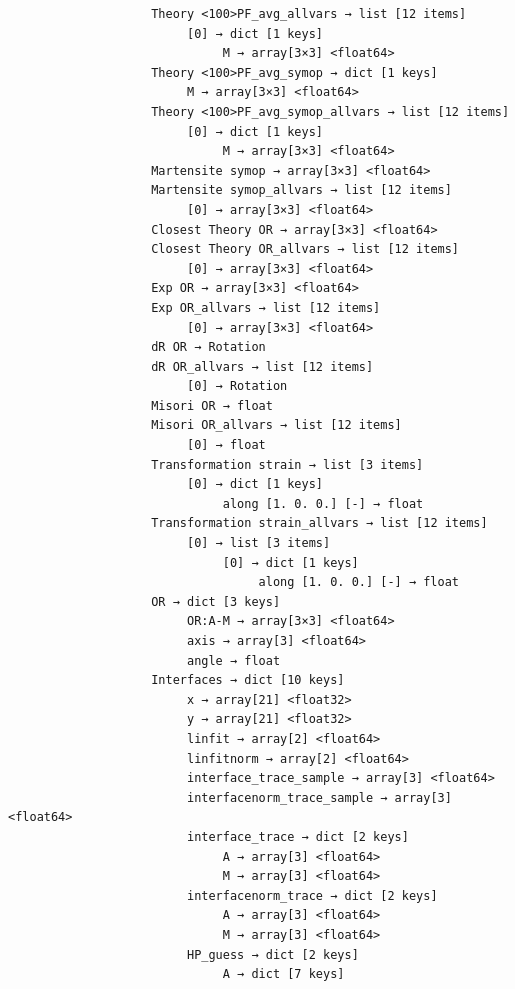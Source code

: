 \documentclass[a4paper,10pt]{article}
\begin{document}
\begin{verbatim}
                    Theory <100>PF_avg_allvars → list [12 items]
                         [0] → dict [1 keys]
                              M → array[3×3] <float64>
                    Theory <100>PF_avg_symop → dict [1 keys]
                         M → array[3×3] <float64>
                    Theory <100>PF_avg_symop_allvars → list [12 items]
                         [0] → dict [1 keys]
                              M → array[3×3] <float64>
                    Martensite symop → array[3×3] <float64>
                    Martensite symop_allvars → list [12 items]
                         [0] → array[3×3] <float64>
                    Closest Theory OR → array[3×3] <float64>
                    Closest Theory OR_allvars → list [12 items]
                         [0] → array[3×3] <float64>
                    Exp OR → array[3×3] <float64>
                    Exp OR_allvars → list [12 items]
                         [0] → array[3×3] <float64>
                    dR OR → Rotation
                    dR OR_allvars → list [12 items]
                         [0] → Rotation
                    Misori OR → float
                    Misori OR_allvars → list [12 items]
                         [0] → float
                    Transformation strain → list [3 items]
                         [0] → dict [1 keys]
                              along [1. 0. 0.] [-] → float
                    Transformation strain_allvars → list [12 items]
                         [0] → list [3 items]
                              [0] → dict [1 keys]
                                   along [1. 0. 0.] [-] → float
                    OR → dict [3 keys]
                         OR:A-M → array[3×3] <float64>
                         axis → array[3] <float64>
                         angle → float
                    Interfaces → dict [10 keys]
                         x → array[21] <float32>
                         y → array[21] <float32>
                         linfit → array[2] <float64>
                         linfitnorm → array[2] <float64>
                         interface_trace_sample → array[3] <float64>
                         interfacenorm_trace_sample → array[3] <float64>
                         interface_trace → dict [2 keys]
                              A → array[3] <float64>
                              M → array[3] <float64>
                         interfacenorm_trace → dict [2 keys]
                              A → array[3] <float64>
                              M → array[3] <float64>
                         HP_guess → dict [2 keys]
                              A → dict [7 keys]

\end{verbatim}
\end{document}

